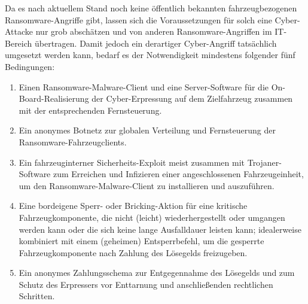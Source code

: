 Da es nach aktuellem Stand noch keine öffentlich bekannten fahrzeugbezogenen 
Ransomware-Angriffe gibt, lassen sich die Voraussetzungen für solch eine Cyber-Attacke 
nur grob abschätzen und von anderen Ransomware-Angriffen im IT-Bereich übertragen. Damit 
jedoch ein derartiger Cyber-Angriff tatsächlich umgesetzt werden kann, bedarf es der 
Notwendigkeit mindestens folgender fünf Bedingungen:

\begin{enumerate}
    \item Einen Ransomware-Malware-Client und eine Server-Software für die On-Board-Realisierung 
    der Cyber-Erpressung auf dem Zielfahrzeug zusammen mit der entsprechenden Fernsteuerung.
    \item Ein anonymes Botnetz zur globalen Verteilung und Fernsteuerung der Ransomware-Fahrzeugclients.
    \item Ein fahrzeuginterner Sicherheits-Exploit meist zusammen mit Trojaner-Software zum 
    Erreichen und Infizieren einer angeschlossenen Fahrzeugeinheit, um den Ransomware-Malware-Client 
    zu installieren und auszuführen.
    \item Eine bordeigene Sperr- oder Bricking-Aktion für eine kritische Fahrzeugkomponente, die 
    nicht (leicht) wiederhergestellt oder umgangen werden kann oder die sich keine lange Ausfalldauer 
    leisten kann; idealerweise kombiniert mit einem (geheimen) Entsperrbefehl, um die gesperrte 
    Fahrzeugkomponente nach Zahlung des Lösegelds freizugeben.
    \item Ein anonymes Zahlungsschema zur Entgegennahme des Lösegelds und zum Schutz des Erpressers 
    vor Enttarnung und anschließenden rechtlichen Schritten. 
\end{enumerate}

